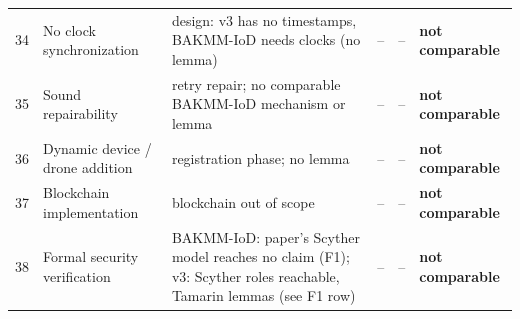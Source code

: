 \begin{table}[!t]
\begin{tabular}{rp{3.0cm}p{4.3cm}p{2.5cm}p{2.0cm}l}
34 & No clock synchronization & design: v3 has no timestamps, BAKMM-IoD needs clocks (no lemma) & -- & -- & \textbf{not comparable} \\
35 & Sound repairability & retry repair; no comparable BAKMM-IoD mechanism or lemma & -- & -- & \textbf{not comparable} \\
36 & Dynamic device / drone addition & registration phase; no lemma & -- & -- & \textbf{not comparable} \\
37 & Blockchain implementation & blockchain out of scope & -- & -- & \textbf{not comparable} \\
38 & Formal security verification & BAKMM-IoD: paper's Scyther model reaches no claim (F1); v3: Scyther roles reachable, Tamarin lemmas (see F1 row) & -- & -- & \textbf{not comparable} \\
\bottomrule
\end{tabular}
\end{table}
